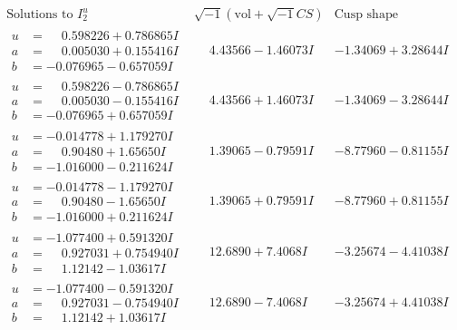 \documentclass[1p]{elsarticle_modified}
\theoremstyle{definition}
\newcommand{\I}{\sqrt{-1}}
\begin{document}
$$\begin{array}{c|c|c}  
\text{Solutions to }I^u_{2}& \I (\text{vol} + \sqrt{-1}CS) & \text{Cusp shape}\\
 \hline 
\begin{aligned}
u &= \phantom{-}0.598226 + 0.786865 I \\
a &= \phantom{-}0.005030 + 0.155416 I \\
b &= -0.076965 - 0.657059 I\end{aligned}
 & \phantom{-}4.43566 - 1.46073 I & -1.34069 + 3.28644 I \\ \hline\begin{aligned}
u &= \phantom{-}0.598226 - 0.786865 I \\
a &= \phantom{-}0.005030 - 0.155416 I \\
b &= -0.076965 + 0.657059 I\end{aligned}
 & \phantom{-}4.43566 + 1.46073 I & -1.34069 - 3.28644 I \\ \hline\begin{aligned}
u &= -0.014778 + 1.179270 I \\
a &= \phantom{-}0.90480 + 1.65650 I \\
b &= -1.016000 - 0.211624 I\end{aligned}
 & \phantom{-}1.39065 - 0.79591 I & -8.77960 - 0.81155 I \\ \hline\begin{aligned}
u &= -0.014778 - 1.179270 I \\
a &= \phantom{-}0.90480 - 1.65650 I \\
b &= -1.016000 + 0.211624 I\end{aligned}
 & \phantom{-}1.39065 + 0.79591 I & -8.77960 + 0.81155 I \\ \hline\begin{aligned}
u &= -1.077400 + 0.591320 I \\
a &= \phantom{-}0.927031 + 0.754940 I \\
b &= \phantom{-}1.12142 - 1.03617 I\end{aligned}
 & \phantom{-}12.6890 + 7.4068 I & -3.25674 - 4.41038 I \\ \hline\begin{aligned}
u &= -1.077400 - 0.591320 I \\
a &= \phantom{-}0.927031 - 0.754940 I \\
b &= \phantom{-}1.12142 + 1.03617 I\end{aligned}
 & \phantom{-}12.6890 - 7.4068 I & -3.25674 + 4.41038 I \\ \hline\begin{aligned}

\end{aligned}
\end{array}$$
\end{document}
